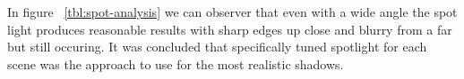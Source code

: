 In figure ~\ref{tbl:spot-analysis} we can observer that even with a wide angle the spot light produces reasonable results with sharp edges up close and blurry from a far but still occuring. It was concluded that specifically tuned spotlight for each scene was the approach to use for the most realistic shadows.
